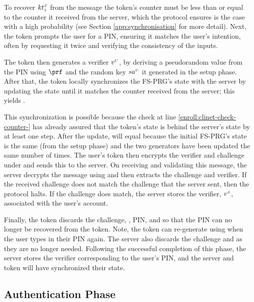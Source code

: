  To recover ${kt}_{\scriptscriptstyle 1}^{\scriptscriptstyle S}$ from the message the token's counter must be less than or equal to the counter it received from the server, which the protocol ensures is the case with a high probability (see Section \ref{app:synchronisation} for more detail). Next, the token prompts the user for a PIN, ensuring it matches the user's intention, often by requesting it twice and verifying the consistency of the inputs.
 


The token then generates a verifier ${v}^{\scriptscriptstyle U}$, by deriving a pseudorandom value from the PIN using $\prf$ and the random key ${sa}^{\scriptscriptstyle U}$ it generated in the setup phase.  After that, the token locally synchronizes the FS-PRG's state with the server by updating the state until it matches the counter received from the server; this yields . 

This synchronization is possible because the check at line \ref{enroll:clinet-check-counter-} has already assured that the token's state is behind the server's state by at least one step. After the update,  will equal  because the initial FS-PRG's state is the same (from the setup phase) and the two generators have been updated the same number of times. The user's token then encrypts the verifier and challenge under  and sends this to the server. 
On receiving and validating this message, the server decrypts the message using  and then extracts the challenge and verifier.
If the received challenge does not match the challenge that the server sent, then the protocol halts.
If the challenge does match, the server stores the verifier, ${v}^{\scriptscriptstyle S}$,  associated with the user's account.

Finally, the token discards the challenge, , PIN, and \VC{\verifier} so that the PIN can no longer be recovered from the token. Note, the token can re-generate \VC{\verifier} using \VC{\salt} when the user types in their PIN again. The server also discards the challenge and  as they are no longer needed. Following the successful completion of this phase, the server stores the verifier corresponding to the user's PIN, and the server and token will have synchronized their state.

\vspace{-2mm}
\subsection{Authentication Phase}
\label{sec:authentication}

